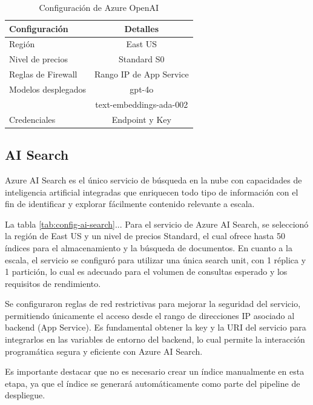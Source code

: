 \begin{table}[h]
	\centering
	\caption[Configuración de Azure OpenAI]{Configuración de Azure OpenAI}
	\begin{tabular}{l c}    
		\toprule
		\textbf{Configuración} 	 & \textbf{Detalles} 	\\
		\midrule
		Región              &	East US 				        \\		
		Nivel de precios    & Standard S0				      \\
		Reglas de Firewall  & Rango IP de App Service \\
    Modelos desplegados	& gpt-4o				          \\
            	          & text-embeddings-ada-002	\\
    Credenciales	      & Endpoint y Key 		      \\
		\bottomrule
		\hline
	\end{tabular}
	\label{tab:config-openai}
\end{table}

\subsection{AI Search}

Azure AI Search es el único servicio de búsqueda en la nube con capacidades de inteligencia artificial integradas 
que enriquecen todo tipo de información con el fin de identificar y explorar fácilmente contenido relevante a escala.

La tabla \ref{tab:config-ai-search}... Para el servicio de Azure AI Search, se seleccionó la región de East US y un nivel de precios Standard, el cual ofrece hasta 50 índices para el almacenamiento y la búsqueda de documentos. En cuanto a la escala, el servicio se configuró para utilizar una única search unit, con 1 réplica y 1 partición, lo cual es adecuado para el volumen de consultas esperado y los requisitos de rendimiento.

Se configuraron reglas de red restrictivas para mejorar la seguridad del servicio, permitiendo únicamente el acceso desde el rango de direcciones IP asociado al backend (App Service). Es fundamental obtener la key y la URI del servicio para integrarlos en las variables de entorno del backend, lo cual permite la interacción programática segura y eficiente con Azure AI Search.

Es importante destacar que no es necesario crear un índice manualmente en esta etapa, ya que el índice se generará automáticamente como parte del pipeline de despliegue.


